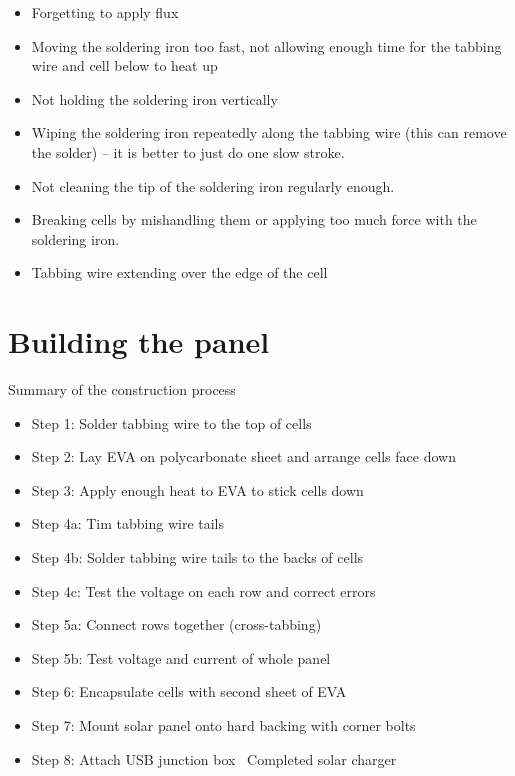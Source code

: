 \documentclass{article}
\theoremstyle{definition}
\theoremstyle{definition}
\theoremstyle{remark}
\begin{document}
    \begin{itemize}
      \item Forgetting to apply flux
      \item Moving the soldering iron too fast, not allowing enough time for the tabbing wire and cell below to heat up
      \item Not holding the soldering iron vertically
      \item Wiping the soldering iron repeatedly along the tabbing wire (this can remove the solder) – it is better to just do one slow stroke.
      \item Not cleaning the tip of the soldering iron regularly enough.
      \item Breaking cells by mishandling them or applying too much force with the soldering iron.
      \item Tabbing wire extending over the edge of the cell
    \end{itemize}
  


\section{Building the panel} %
\label{sec:building_the_panel}

  Summary of the construction process

  \begin{itemize}
    \item Step 1: Solder tabbing wire to the top of cells
    \item Step 2: Lay EVA on polycarbonate sheet and arrange cells face down
    \item Step 3: Apply enough heat to EVA to stick cells down
    \item Step 4a: Tim tabbing wire tails  
    \item Step 4b: Solder tabbing wire tails to the backs of cells
    \item Step 4c: Test the voltage on each row and correct errors
    \item Step 5a: Connect rows together (cross-tabbing)
    \item Step 5b: Test voltage and current of whole panel
    \item Step 6: Encapsulate cells with second sheet of EVA
    \item Step 7: Mount solar panel onto hard backing with corner bolts
    \item Step 8: Attach USB junction box  Completed solar charger
  \end{itemize}
\end{document}
